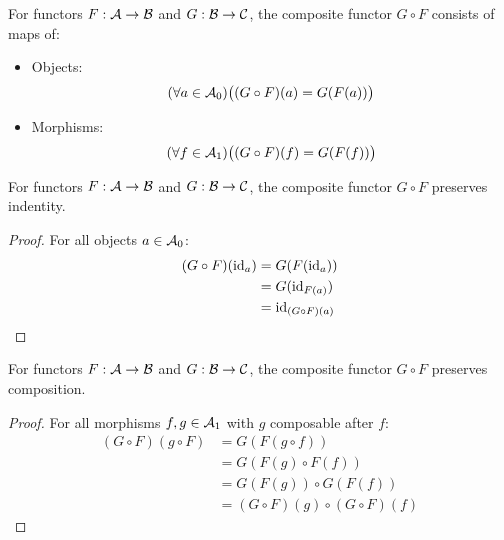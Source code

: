 \begin{definition} For functors $F:\mathcal{A}\to \mathcal{B}$ and
  $G:\mathcal{B}\to \mathcal{C}$, the composite functor $G\circ F$ consists of maps of:
  \parencite{leinster:basic_category_theory}
  \begin{itemize}
    \item Objects:
      \[(\forall a \in \mathcal{A}_0)
        \big((G\circ F)(a) = G(F(a))\big)\]
    \item Morphisms:
      \[(\forall f\in \mathcal{A}_1)
        \big((G\circ F)(f) = G(F(f))\big)\]
  \end{itemize}
\end{definition}

\begin{theorem}
  For functors $F:\mathcal{A}\to \mathcal{B}$ and $G:\mathcal{B}\to \mathcal{C}$, the composite functor $G\circ F$
  preserves indentity.

  \begin{proof}
    For all objects $a\in \mathcal{A}_0$:
    \[
      \begin{aligned}
        (G\circ F)(\mathrm{id}_a)
        &= G(F(\mathrm{id}_a))\\
        &= G(\mathrm{id}_{F(a)})\\
        &= \mathrm{id}_{(G\circ F)(a)}
      \end{aligned}
    \]
  \end{proof}
\end{theorem}

\begin{theorem}
  For functors $F:\mathcal{A}\to \mathcal{B}$ and $G:\mathcal{B}\to \mathcal{C}$, the composite functor $G\circ F$
  preserves composition.

  \begin{proof}
    For all morphisms $f,g\in \mathcal{A}_1$ with $g$ composable after $f$:
    \[
      \begin{aligned}
        (G\circ F)(g\circ F)
        &= G(F(g\circ f))\\
        &= G(F(g)\circ F(f))\\
        &= G(F(g))\circ G(F(f))\\
        &= (G\circ F)(g)\circ(G\circ F)(f)
      \end{aligned}
    \]
  \end{proof}
\end{theorem}


